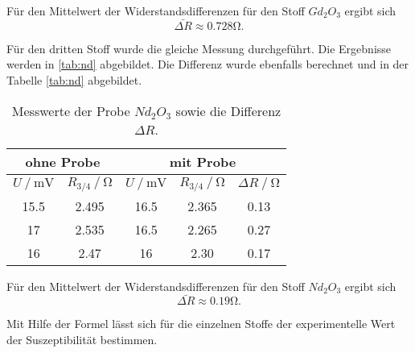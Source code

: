 Für den Mittelwert der Widerstandsdifferenzen für den Stoff $Gd_2O_3$ ergibt sich
\begin{equation*}
  \bar{\Delta R} \approx 0.728 \si{\ohm}.
\end{equation*}

Für den dritten Stoff wurde die gleiche Messung durchgeführt. Die Ergebnisse werden in \eqref{tab:nd}
abgebildet. Die Differenz wurde ebenfalls berechnet und in der Tabelle \eqref{tab:nd} abgebildet.
\begin{table}
  \centering
  \caption{Messwerte der Probe $Nd_2O_3$ sowie die Differenz $\Delta R$.}
  \label{tab:nd}
\begin{tabular}{c c | c c | c}
  \hline
  \multicolumn{2}{c}{ohne Probe} & \multicolumn{3}{c}{mit Probe} \\
  \hline
  $U\mathbin{/} \si{\mV}$ & $R_{3/4}\mathbin{/} \si{\ohm}$ & $U\mathbin{/} \si{\mV}$ & $R_{3/4}\mathbin{/} \si{\ohm}$ & $\Delta R\mathbin{/}\si{\ohm}$ \\
  \hline
  15.5 & 2.495 & 16.5  & 2.365 & 0.13\\
  17  & 2.535 & 16.5  & 2.265 & 0.27\\
  16 & 2.47& 16 & 2.30 & 0.17\\
  \bottomrule
  \end{tabular}
\end{table}

Für den Mittelwert der Widerstandsdifferenzen für den Stoff $Nd_2O_3$ ergibt sich
\begin{equation*}
  \bar{\Delta R} \approx 0.19 \si{\ohm}.
\end{equation*}


Mit Hilfe der Formel %
lässt sich für die einzelnen Stoffe der experimentelle Wert der Suszeptibilität bestimmen.

